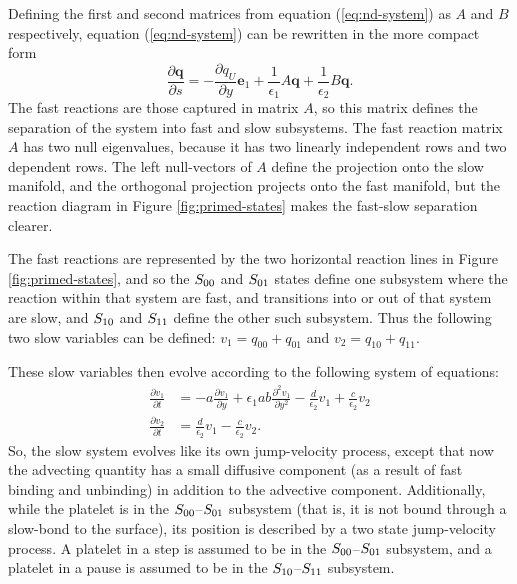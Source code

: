 \documentclass{biophys-new}
\newcommand{\Pder}[2]{\frac{\partial #1}{\partial #2}}
\begin{document}
Defining the first and second matrices from equation
(\ref{eq:nd-system}) as $A$ and $B$ respectively, equation
(\ref{eq:nd-system}) can be rewritten in the more compact form
\begin{equation}
  \label{eq:four-par-ad-fp}
  \Pder{\mathbf{q}}{s} = - \Pder{q_{U}}{y} \mathbf{e}_1 +
  \frac{1}{\epsilon_1} A \mathbf{q} + \frac{1}{\epsilon_2} B
  \mathbf{q}.
\end{equation}
The fast reactions are those captured in matrix $A$, so this matrix
defines the separation of the system into fast and slow
subsystems. The fast reaction matrix $A$ has two null eigenvalues,
because it has two linearly independent rows and two dependent
rows. The left null-vectors of $A$ define the projection onto the slow
manifold, and the orthogonal projection projects onto the fast
manifold, but the reaction diagram in Figure \ref{fig:primed-states}
makes the fast-slow separation clearer.

The fast reactions are represented by the two horizontal reaction
lines in Figure \ref{fig:primed-states}, and so the $S_{00}$
and $S_{01}$ states define one subsystem where the reaction
within that system are fast, and transitions into or out of that
system are slow, and $S_{10}$ and $S_{11}$ define the
other such subsystem. Thus the following two slow variables can be
defined: $v_1 = q_{00} + q_{01}$ and $v_2 = q_{10} + q_{11}$.

These slow variables then evolve according to the following system of
equations:
\begin{align}
  \label{eq:v1-reduced}
  \Pder{v_1}{t} &= -a \Pder{v_1}{y} + \epsilon_1 a b \frac{\partial^2
                  v_1}{\partial y^2} - \frac{d}{\epsilon_2} v_1 +
                  \frac{c}{\epsilon_2} v_2 \\
  \label{eq:v2-reduced}
  \Pder{v_2}{t} &= \frac{d}{\epsilon_2} v_1 - \frac{c}{\epsilon_2} v_2.
\end{align}
So, the slow system evolves like its own jump-velocity process, except
that now the advecting quantity has a small diffusive component (as a
result of fast binding and unbinding) in addition to the advective
component. Additionally, while the platelet is in the
$S_{00}$--$S_{01}$ subsystem (that is, it is not bound
through a slow-bond to the surface), its position is described
by a two state jump-velocity process. A platelet in a step is assumed
to be in the $S_{00}$--$S_{01}$ subsystem, and a platelet
in a pause is assumed to be in the $S_{10}$--$S_{11}$
subsystem. 
\end{document}
